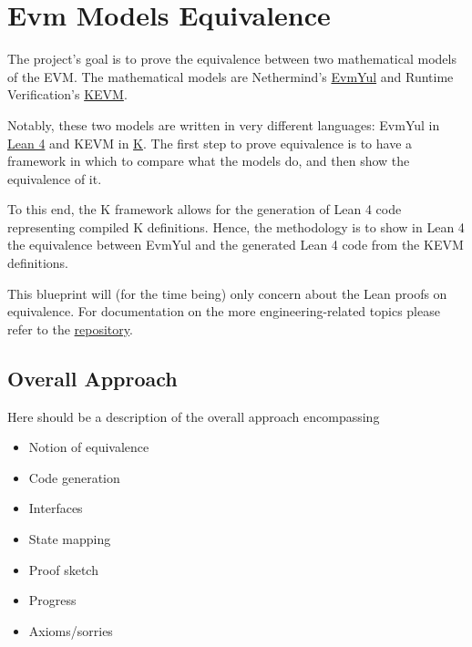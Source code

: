 \chapter*{Evm Models Equivalence}\label{evm-equiv-intro}

The project's goal is to prove the equivalence between two mathematical models of the EVM.
The mathematical models are Nethermind's \href{https://github.com/nethermindEth/EVMYulLean/}{EvmYul}
and Runtime Verification's \href{https://github.com/runtimeverification/evm-semantics}{KEVM}.

Notably, these two models are written in very different languages: EvmYul in
\href{https://lean-lang.org}{Lean 4} and KEVM in \href{https://kframework.org}{K}.
The first step to prove equivalence is to have a framework in which to compare
what the models do, and then show the equivalence of it.

To this end, the K framework allows for the generation of Lean 4 code
representing compiled K definitions.
Hence, the methodology is to show in Lean 4 the equivalence between EvmYul and
the generated Lean 4 code from the KEVM definitions.

This blueprint will (for the time being) only concern about the Lean proofs on
equivalence. For documentation on the more engineering-related topics please
refer to the
\href{https://github.com/runtimeverification/evm-equivalence}{repository}.

\section*{Overall Approach}

Here should be a description of the overall approach encompassing
\begin{itemize}
\item Notion of equivalence
\item Code generation
\item Interfaces
\item State mapping
\item Proof sketch
\item Progress
\item Axioms/sorries
\end{itemize}

